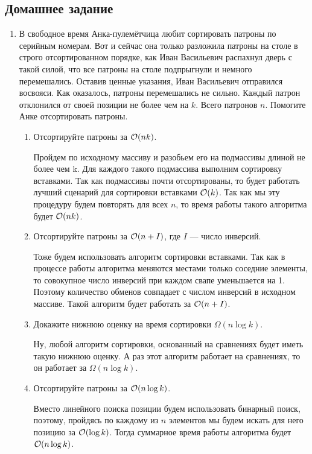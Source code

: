 \subsection{Домашнее задание}
\begin{enumerate}
 \item
  В свободное время Анка-пулемётчица любит сортировать патроны по
  серийным номерам. Вот и сейчас она только разложила патроны на
  столе в строго отсортированном порядке, как Иван Васильевич
  распахнул дверь с такой силой, что все патроны на столе подпрыгнули
  и немного перемешались. Оставив ценные указания, Иван Васильевич
  отправился восвояси.  Как оказалось, патроны перемешались не
  сильно. Каждый патрон отклонился от своей позиции не более чем на
  $k$. Всего патронов $n$. Помогите Анке отсортировать
  патроны.

  \begin{enumerate}
     \item Отсортируйте патроны за $\mathcal{O}(nk)$.
     \begin{solution}
      Пройдем по исходному массиву и разобьем его на подмассивы длиной не более чем k. Для каждого такого подмассива выполним сортировку вставками. Так как подмассивы почти отсортированы, то будет работать лучший сценарий для сортировки вставками $\mathcal{O}(k)$. Так как мы эту процедуру будем повторять для всех $n$, то время работы такого алгоритма будет $\mathcal{O}(nk)$.
     \end{solution}
     \item Отсортируйте патроны за $\mathcal{O}(n + I)$, 
      где $I$ --- число инверсий.
     \begin{solution}
      Тоже будем использовать алгоритм сортировки вставками. Так как в процессе работы алгоритма меняются местами только соседние элементы, то совокупное число инверсий при каждом свапе уменьшается на 1. Поэтому количество обменов совпадает с числом инверсий в исходном массиве. Такой алгоритм будет работать за $\mathcal{O}(n + I)$.
     \end{solution}
     \item Докажите нижнюю оценку на время сортировки $\Omega(n \log k)$.
     \begin{solution}
      Ну, любой алгоритм сортировки, основанный на сравнениях будет иметь такую нижнюю оценку. А раз этот алгоритм работает на сравнениях, то он работает за $\Omega(n \log k)$.
     \end{solution}
     \item Отсортируйте патроны за $\mathcal{O}(n \log k)$.
     \begin{solution}
      Вместо линейного поиска позиции будем использовать бинарный поиск, поэтому, пройдясь по каждому из $n$ элементов мы будем искать для него позицию за $\mathcal{O}(\log k)$. Тогда суммарное время работы алгоритма будет $\mathcal{O}(n \log k)$.
     \end{solution}
  \end{enumerate}


\end{enumerate}
